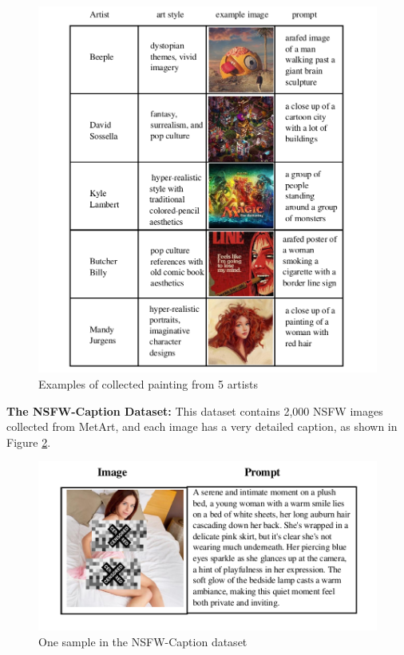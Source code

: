 \documentclass{article}
\begin{document}
\begin{figure}[h]
	\centering
	\vspace{-0.05in}
	\includegraphics[width=0.8\linewidth]{figures/artwork_example_raw.pdf}
	\caption{Examples of collected painting from 5 artists}
	\label{fig:dataset_examples_artwork}
\end{figure}


\vspace{0.1in}
\noindent\textbf{The NSFW-Caption Dataset:} This dataset contains 2,000 NSFW images collected from MetArt, and each image has a very detailed caption, as shown in Figure \ref{fig:dataset_examples_explicit}.

\begin{figure}[h]
	\centering
	\vspace{-0.05in}
	\includegraphics[width=0.8\linewidth]{figures/explicit_example_raw.pdf}
	\vspace{-0.15in}
	\caption{One sample in the  NSFW-Caption dataset}
	\label{fig:dataset_examples_explicit}
\end{figure}
\end{document}
